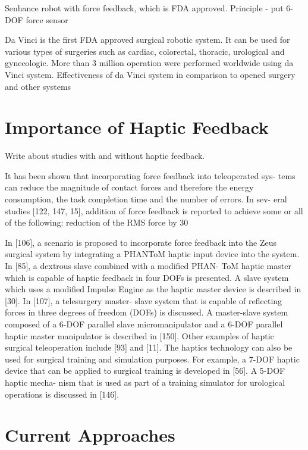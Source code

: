 Senhance robot with force feedback, which is FDA approved. Principle - put 
6-DOF force sensor 

Da Vinci is the first FDA approved surgical robotic system. It can be used for 
various types of surgeries such as cardiac, colorectal, thoracic, urological 
and gynecologic. More than 3 million operation were performed worldwide using da Vinci system. \cite{_intuitive_2018}
Effectiveness of da Vinci system in comparison to opened surgery and other systems \cite{yu_safety_2014}


\section{Importance of Haptic Feedback}
\label{sec:hapticFeedbackImportance}
Write about studies with and without haptic feedback.

It has been shown that incorporating force feedback into teleoperated sys- tems can reduce the magnitude of contact forces and therefore the energy consumption, the task completion time and the number of errors. In sev- eral studies [122, 147, 15], addition of force feedback is reported to achieve some or all of the following: reduction of the RMS force by 30%

In [106], a scenario is proposed to incorporate force feedback into the Zeus surgical system by integrating a PHANToM haptic input device into the system. In [85], a dextrous slave combined with a modified PHAN- ToM haptic master which is capable of haptic feedback in four DOFs is presented. A slave system which uses a modified Impulse Engine as the haptic master device is described in [30]. In [107], a telesurgery master- slave system that is capable of reflecting forces in three degrees of freedom (DOFs) is discussed. A master-slave system composed of a 6-DOF parallel slave micromanipulator and a 6-DOF parallel haptic master manipulator is described in [150]. Other examples of haptic surgical teleoperation include [93] and [11]. The haptics technology can also be used for surgical training and simulation purposes. For example, a 7-DOF haptic device that can be applied to surgical training is developed in [56]. A 5-DOF haptic mecha- nism that is used as part of a training simulator for urological operations is discussed in [146]. 


\section{Current Approaches}
\label{sec:CurAppr}


